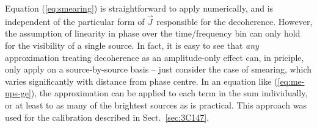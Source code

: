\documentclass[]{aa}
\newcommand{\jones}[2]{\vec {#1}_{#2}}
\begin{document}
%  
%  
%  
%  
%  
%  
%  

Equation (\ref{eq:smearing}) is straightforward to apply numerically, and is independent of the particular form of $\jones{J}{}$ responsible for the decoherence. However, the assumption of linearity in phase over the time/frequency bin can only hold for the visibility of a single source. In fact, it is easy to see that {\em any} approximation treating decoherence as an amplitude-only effect can, in priciple, only apply on a source-by-source basis -- just consider the case of smearing, which varies significantly with distance from phase centre. In an equation like (\ref{eq:me-nps-ge}), the approximation can be applied to each term in the sum individually, or at least to as many of the brightest sources as is practical. This approach was used for the calibration described in Sect.~\ref{sec:3C147}.
\end{document}
